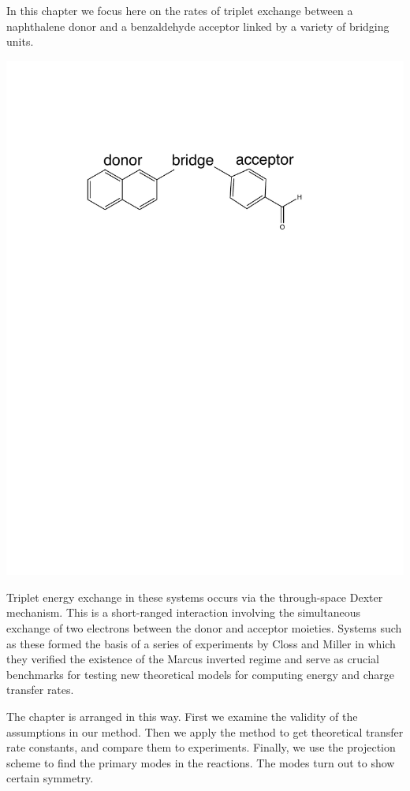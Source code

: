 In this chapter we focus here on the rates of triplet exchange between a naphthalene donor and a benzaldehyde acceptor linked by a variety of bridging units.
\begin{center}
\includegraphics[width=0.50\columnwidth]{Chapters/chap2/Scheme1}
\end{center}
Triplet energy exchange in these systems occurs via the through-space Dexter mechanism\cite{dexter1953theory}.
This is a short-ranged interaction involving the simultaneous exchange of two electrons between the
donor and acceptor moieties.
Systems such as these formed the basis of a series of experiments by  Closs and Miller\cite{miller1984intramolecular}
in which they verified the existence of the Marcus inverted regime
and serve as crucial benchmarks for testing new theoretical models for computing
energy and charge transfer rates\cite{subotnik2008constructing,subotnik2009initial,subotnik2010predicting}.

The chapter is arranged in this way. First we examine the validity of the assumptions in our method. Then we apply the method to get theoretical transfer rate constants, and compare them to experiments. Finally, we use the projection scheme to find the primary modes in the reactions. The modes turn out to show certain symmetry.


